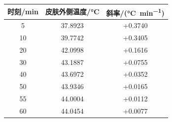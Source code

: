\begin{tabular}{ccc}
  \toprule
    时刻/\si{min} & 皮肤外侧温度/\si{\celsius} & 斜率/(\si{\celsius\per\minute}) \\
  \midrule
    5 & 37.8923 & +0.3740 \\
    10 & 39.7742 & +0.3405 \\
    20 & 42.0998 & +0.1616 \\
    30 & 43.1887 & +0.0755 \\
    40 & 43.6972 & +0.0352 \\
    50 & 43.9346 & +0.0165 \\
    55 & 44.0004 & +0.0112 \\
    60 & 44.0454 & +0.0077 \\
  \bottomrule
\end{tabular}
